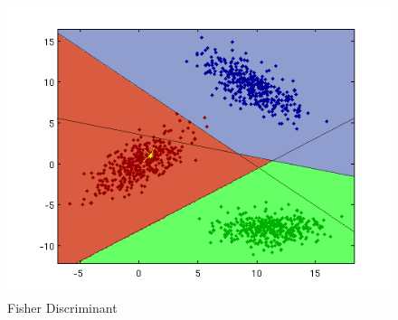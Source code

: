\documentclass[a4paper]{article}
\begin{document}
\begin{figure}[htbp!]
\center
\includegraphics[clip, trim=40px 15px 30px 10px]{ls_fisher.png}
\caption{Fisher Discriminant}
\end{figure}
\end{document}
